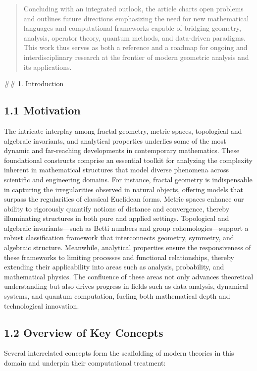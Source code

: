 \documentclass[11pt]{article}
\begin{document}
\begin{abstract}
Concluding with an integrated outlook, the article charts open problems and outlines future directions emphasizing the need for new mathematical languages and computational frameworks capable of bridging geometry, analysis, operator theory, quantum methods, and data-driven paradigms. This work thus serves as both a reference and a roadmap for ongoing and interdisciplinary research at the frontier of modern geometric analysis and its applications.
\end{abstract}## 1. Introduction

\subsection{1.1 Motivation}

The intricate interplay among fractal geometry, metric spaces, topological and algebraic invariants, and analytical properties underlies some of the most dynamic and far-reaching developments in contemporary mathematics. These foundational constructs comprise an essential toolkit for analyzing the complexity inherent in mathematical structures that model diverse phenomena across scientific and engineering domains. For instance, fractal geometry is indispensable in capturing the irregularities observed in natural objects, offering models that surpass the regularities of classical Euclidean forms. Metric spaces enhance our ability to rigorously quantify notions of distance and convergence, thereby illuminating structures in both pure and applied settings. Topological and algebraic invariants—such as Betti numbers and group cohomologies—support a robust classification framework that interconnects geometry, symmetry, and algebraic structure. Meanwhile, analytical properties ensure the responsiveness of these frameworks to limiting processes and functional relationships, thereby extending their applicability into areas such as analysis, probability, and mathematical physics. The confluence of these areas not only advances theoretical understanding but also drives progress in fields such as data analysis, dynamical systems, and quantum computation, fueling both mathematical depth and technological innovation.

\subsection{1.2 Overview of Key Concepts}

Several interrelated concepts form the scaffolding of modern theories in this domain and underpin their computational treatment:
\end{document}
